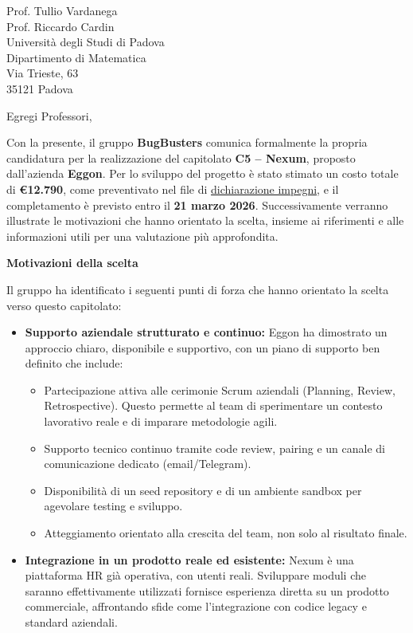 \documentclass[a4paper,11pt]{letter}
\begin{document}
\begin{letter}{Prof. Tullio Vardanega\\Prof. Riccardo Cardin\\Universit\`a degli Studi di Padova\\Dipartimento di Matematica\\Via Trieste, 63\\35121 Padova}
\vspace{1.5em}

\opening{Egregi Professori,}

Con la presente, il gruppo \textbf{BugBusters} comunica formalmente la propria candidatura per la realizzazione
 del capitolato \textbf{C5 -- Nexum}, proposto dall'azienda \textbf{Eggon}. 
 Per lo sviluppo del progetto è stato stimato un costo totale di \textbf{€12.790}, come preventivato nel file di 
 \href{https://bugbustersunipd.github.io/BugBusterSite/assets/docs/DICHIARAZIONE_IMPEGNI/Dichiarazione_impegni.pdf}{dichiarazione impegni},
  e il completamento è previsto entro il \textbf{21 marzo 2026}. Successivamente verranno illustrate le motivazioni che hanno 
 orientato la scelta, insieme ai riferimenti e alle informazioni utili per una valutazione 
 più approfondita.

\vspace{0.8em}

	\textbf{Motivazioni della scelta}


Il gruppo ha identificato i seguenti punti di forza che hanno orientato la scelta verso questo capitolato:

\begin{itemize}
    \item \textbf{Supporto aziendale strutturato e continuo:} Eggon ha dimostrato un approccio chiaro, disponibile e supportivo, con un piano di supporto ben definito che include:
    \begin{itemize}
        \item Partecipazione attiva alle cerimonie Scrum aziendali (Planning, Review, Retrospective). Questo permette al team di sperimentare un contesto lavorativo reale e di imparare metodologie agili.
        \item Supporto tecnico continuo tramite code review, pairing e un canale di comunicazione dedicato (email/Telegram).
        \item Disponibilità di un seed repository e di un ambiente sandbox per agevolare testing e sviluppo.
        \item Atteggiamento orientato alla crescita del team, non solo al risultato finale.
    \end{itemize}

    \item \textbf{Integrazione in un prodotto reale ed esistente:} Nexum è una piattaforma HR già operativa, con utenti reali. Sviluppare moduli che saranno effettivamente utilizzati fornisce esperienza diretta su un prodotto commerciale, affrontando sfide come l'integrazione con codice legacy e standard aziendali.


\end{itemize}
\end{letter}
\end{document}
